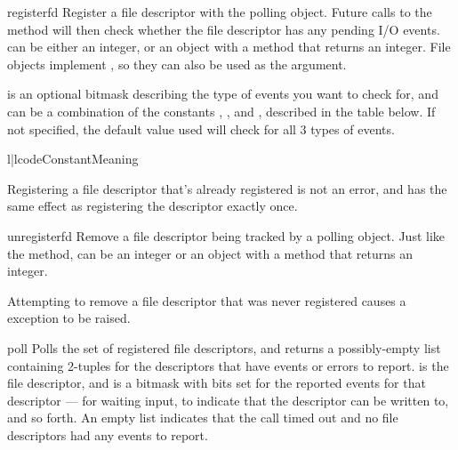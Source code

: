 \begin{methoddesc}{register}{fd}
Register a file descriptor with the polling object.  Future calls to
the  method will then check whether the file descriptor
has any pending I/O events.   can be either an integer, or an
object with a  method that returns an integer.  File
objects implement
, so they can also be used as the argument.

 is an optional bitmask describing the type of events you
want to check for, and can be a combination of the constants
, , and ,
described in the table below.  If not specified, the default value
used will check for all 3 types of events.

\begin{tableii}{l|l}{code}{Constant}{Meaning}
\end{tableii}

Registering a file descriptor that's already registered is not an
error, and has the same effect as registering the descriptor exactly
once. 
 
\end{methoddesc}

\begin{methoddesc}{unregister}{fd}
Remove a file descriptor being tracked by a polling object.  Just like
the  method,  can be an integer or an
object with a  method that returns an integer.

Attempting to remove a file descriptor that was never registered
causes a  exception to be raised.
\end{methoddesc}

\begin{methoddesc}{poll}{}
Polls the set of registered file descriptors, and returns a
possibly-empty list containing  2-tuples
for the descriptors that have events or errors to report.
 is the file descriptor, and  is a bitmask 
with bits set for the reported events for that descriptor
---  for waiting input, 
 to indicate that the descriptor can be written to, and
so forth.
An empty list indicates that the call timed out and no file
descriptors had any events to report.
\end{methoddesc}


